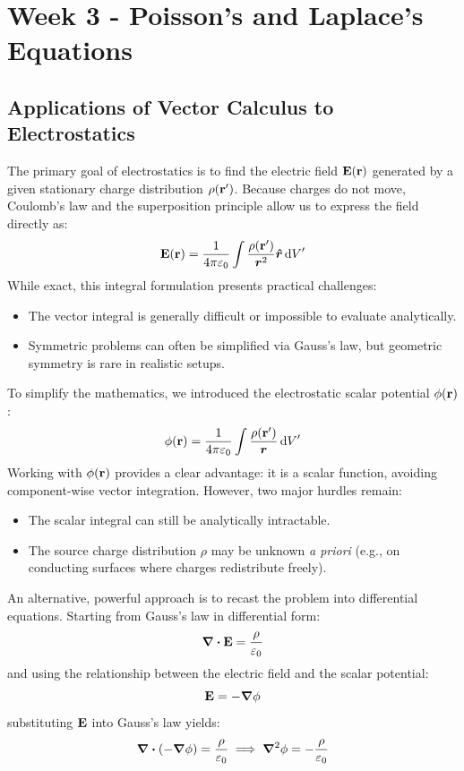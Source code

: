 \section{Week 3 - Poisson's and Laplace's Equations}

\subsection{Applications of Vector Calculus to Electrostatics}

The primary goal of electrostatics is to find the electric field $\vb{E}(\vb{r})$ generated by a given stationary charge distribution $\rho(\vb{r}')$. Because charges do not move, Coulomb's law and the superposition principle allow us to express the field directly as:
\begin{equation}
    \vb{E}(\vb{r}) = \frac{1}{4\pi\varepsilon_0}\int \frac{\rho(\vb{r}')}{\bm{r}^2} \vu*{\bm{r}} \dd{V}'
\end{equation}
While exact, this integral formulation presents practical challenges:
\begin{itemize}
    \item The vector integral is generally difficult or impossible to evaluate analytically.
    \item Symmetric problems can often be simplified via Gauss's law, but geometric symmetry is rare in realistic setups.
\end{itemize}

To simplify the mathematics, we introduced the electrostatic scalar potential $\phi(\vb{r})$:
\begin{equation}
    \phi(\vb{r}) = \frac{1}{4\pi\varepsilon_0}\int \frac{\rho(\vb{r}')}{\bm{r}} \dd{V}'
\end{equation}
Working with $\phi(\vb{r})$ provides a clear advantage: it is a scalar function, avoiding component-wise vector integration. However, two major hurdles remain:
\begin{itemize}
    \item The scalar integral can still be analytically intractable.
    \item The source charge distribution $\rho$ may be unknown \emph{a priori} (e.g., on conducting surfaces where charges redistribute freely).
\end{itemize}

An alternative, powerful approach is to recast the problem into differential equations. Starting from Gauss's law in differential form:
\begin{equation}
    \div{\vb{E}} = \frac{\rho}{\varepsilon_0}
\end{equation}
and using the relationship between the electric field and the scalar potential:
\begin{equation}
    \vb{E} = -\grad{\phi}
\end{equation}
substituting $\vb{E}$ into Gauss's law yields:
\begin{equation}
    \div(-\grad{\phi}) = \frac{\rho}{\varepsilon_0} \implies \grad^2\phi = -\frac{\rho}{\varepsilon_0}
\end{equation}

